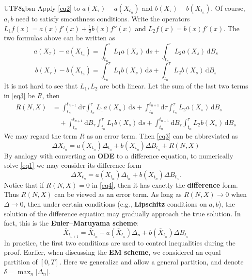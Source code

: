 \documentclass{article}
\begin{document}
\begin{CJK*}{UTF8}{gbsn}
Apply \ref{eq2} to $a(X_\tau)-a(X_{t_{n}})$ and $b(X_\tau)-b(X_{t_{n}})$. Of course, $a,b$ need to satisfy smoothness conditions. Write the operators $L_1f(x)=a(x)f'(x)+\frac{1}{2}b(x)f''(x)$ and $L_2f(x)=b(x)f'(x)$. The two formulas above can be written as
\begin{equation}\label{eq6}
a(X_\tau)-a(X_{t_{n}})=\int_{t_n}^\tau L_1 a(X_s)\,\mathrm{d}s+\int_{t_n}^\tau L_2 a(X_s)\,\mathrm{d}B_s
\end{equation}
\begin{equation}\label{eq7}
b(X_\tau)-b(X_{t_{n}})=\int_{t_n}^\tau L_1 b(X_s)\,\mathrm{d}s+\int_{t_n}^\tau L_2 b(X_s)\,\mathrm{d}B_s
\end{equation}
It is not hard to see that $L_1,L_2$ are both linear. Let the sum of the last two terms in \ref{eq3} be $R$, then
\begin{equation}\begin{aligned}
R(N,X)
&=\int_{t_n}^{t_{n+1}}\!\mathrm{d}\tau\int_{t_n}^\tau L_1 a(X_s)\,\mathrm{d}s+
\int_{t_n}^{t_{n+1}}\!\mathrm{d}\tau\int_{t_n}^\tau L_2 a(X_s)\,\mathrm{d}B_s\\
&\quad+\int_{t_n}^{t_{n+1}}\!\mathrm{d}B_\tau\int_{t_n}^\tau L_1 b(X_s)\,\mathrm{d}s
+\int_{t_n}^{t_{n+1}}\!\mathrm{d}B_\tau\int_{t_n}^\tau L_2 b(X_s)\,\mathrm{d}B_s
\end{aligned}\label{eq8}\end{equation}
We may regard the term $R$ as an error term. Then \ref{eq3} can be abbreviated as
\begin{equation}
    \Delta X_{t_n}=a(X_{t_n})\Delta_{t_n}+b(X_{t_{n}})\Delta B_{t_n}+R(N,X)\label{eq4}
\end{equation}
By analogy with converting an \textbf{ODE} to a difference equation, to numerically solve \ref{eq1} we may consider its difference form
$$
    \Delta X_{t_n}=a(X_{t_n})\Delta_{t_n}+b(X_{t_{n}})\Delta B_{t_n}.
$$
Notice that if $R(N,X)=0$ in \ref{eq4}, then it has exactly the \textbf{difference} form. Thus $R(N,X)$ can be viewed as an error term. As long as $R(N,X)\to0$ when $\Delta\to0$, then under certain conditions (e.g., \textbf{Lipschitz} conditions on $a,b$), the solution of the difference equation may gradually approach the true solution. In fact, this is the \textbf{Euler–Maruyama scheme}:
\begin{equation}
    \bar{X}_{t_{n+1}}=\bar{X}_{t_n}+a(\bar{X}_{t_{n}})\Delta_n+b(\bar{X}_{t_{n}})\Delta B_{t_n}\label{em}
\end{equation}
In practice, the first two conditions are used to control inequalities during the proof. Earlier, when discussing the \textbf{EM scheme}, we considered an equal partition of $[0,T]$. Here we generalize and allow a general partition, and denote $\delta=\max_n|\Delta_n|$.


\end{CJK*}
\end{document}
